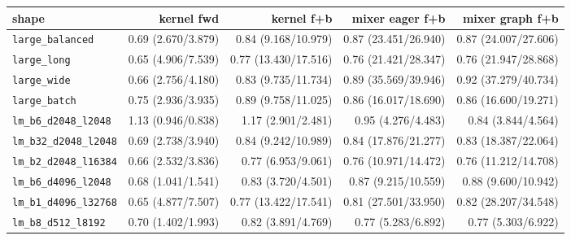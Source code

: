 \begin{tabular}{l r r r r }
\toprule
shape & kernel fwd & kernel f+b & mixer eager f+b & mixer graph f+b \\
\midrule
\texttt{large\_balanced} & 0.69 (2.670/3.879) & 0.84 (9.168/10.979) & 0.87 (23.451/26.940) & 0.87 (24.007/27.606) \\
\texttt{large\_long} & 0.65 (4.906/7.539) & 0.77 (13.430/17.516) & 0.76 (21.421/28.347) & 0.76 (21.947/28.868) \\
\texttt{large\_wide} & 0.66 (2.756/4.180) & 0.83 (9.735/11.734) & 0.89 (35.569/39.946) & 0.92 (37.279/40.734) \\
\texttt{large\_batch} & 0.75 (2.936/3.935) & 0.89 (9.758/11.025) & 0.86 (16.017/18.690) & 0.86 (16.600/19.271) \\
\texttt{lm\_b6\_d2048\_l2048} & 1.13 (0.946/0.838) & 1.17 (2.901/2.481) & 0.95 (4.276/4.483) & 0.84 (3.844/4.564) \\
\texttt{lm\_b32\_d2048\_l2048} & 0.69 (2.738/3.940) & 0.84 (9.242/10.989) & 0.84 (17.876/21.277) & 0.83 (18.387/22.064) \\
\texttt{lm\_b2\_d2048\_l16384} & 0.66 (2.532/3.836) & 0.77 (6.953/9.061) & 0.76 (10.971/14.472) & 0.76 (11.212/14.708) \\
\texttt{lm\_b6\_d4096\_l2048} & 0.68 (1.041/1.541) & 0.83 (3.720/4.501) & 0.87 (9.215/10.559) & 0.88 (9.600/10.942) \\
\texttt{lm\_b1\_d4096\_l32768} & 0.65 (4.877/7.507) & 0.77 (13.422/17.541) & 0.81 (27.501/33.950) & 0.82 (28.207/34.548) \\
\texttt{lm\_b8\_d512\_l8192} & 0.70 (1.402/1.993) & 0.82 (3.891/4.769) & 0.77 (5.283/6.892) & 0.77 (5.303/6.922) \\
\bottomrule
\end{tabular}

